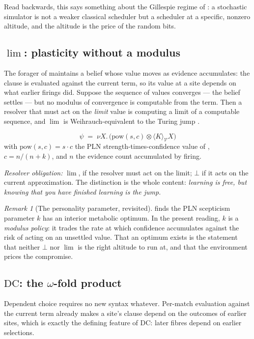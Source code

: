 \documentclass[11pt]{article}
\theoremstyle{definition}
\theoremstyle{plain}
\theoremstyle{remark}
\newtheorem{remark}{Remark}
\newcommand{\V}{\mathcal{V}}
\newcommand{\tensorv}{\otimes}
\newcommand{\DC}{\mathrm{DC}}
\begin{document}
\noindent
Read backwards, this says something about the Gillespie regime of \cite{weightedgslt}:
a stochastic simulator is not a weaker classical scheduler but a scheduler at a
specific, nonzero altitude, and the altitude is the price of the random bits.

\subsection{$\lim$: plasticity without a modulus}\label{ssec:lim}

The forager of \cite{gradedwhere} maintains a belief whose value moves as evidence
accumulates: the clause is evaluated against the current term, so its value at a site
depends on what earlier firings did. Suppose the sequence of values converges --- the
belief settles --- but no modulus of convergence is computable from the term. Then a
resolver that must act on the \emph{limit} value is computing a limit of a computable
sequence, and $\lim$ is Weihrauch-equivalent to the Turing jump \cite{weihrauch}.

\[
  \psi \;=\; \nu X.\, \big( \mathrm{pow}(s,c) \tensorv \langle K \rangle_\V X \big)
\]
with $\mathrm{pow}(s,c) = s \cdot c$ the PLN strength-times-confidence value of
\cite{gradedwhere}, $c = n/(n+k)$, and $n$ the evidence count accumulated by firing.

\emph{Resolver obligation:} $\lim$, if the resolver must act on the limit;
$\bot$ if it acts on the current approximation. The distinction is the whole content:
\emph{learning is free, but knowing that you have finished learning is the jump.}

\begin{remark}[The personality parameter, revisited]
\cite{gradedwhere} finds the PLN scepticism parameter $k$ has an interior metabolic
optimum. In the present reading, $k$ is a \emph{modulus policy}: it trades the rate at
which confidence accumulates against the risk of acting on an unsettled value. That an
optimum exists is the statement that neither $\bot$ nor $\lim$ is the right altitude to
run at, and that the environment prices the compromise.
\end{remark}

\subsection{$\DC$: the $\omega$-fold product}\label{ssec:dc}

Dependent choice requires no new syntax whatever. Per-match evaluation against the
current term already makes a site's clause depend on the outcomes of earlier sites,
which is exactly the defining feature of $\DC$: later fibres depend on earlier
selections.
\end{document}
